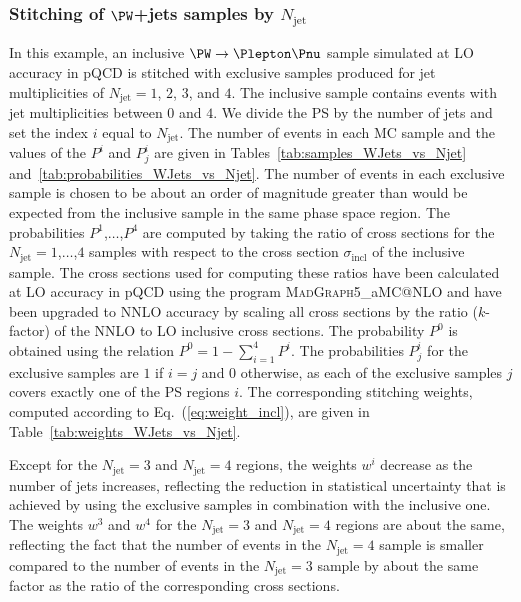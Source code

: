 \documentclass[twocolumn,epjc3]{svjour3}
\makeatletter
\newcommand{\incl}{\ensuremath{\textrm{incl}}\xspace}
\newcommand{\jet}{\ensuremath{\textrm{jet}}\xspace}
\newcommand{\MGvATNLO}{\textsc{MadGraph5}\_aMC@NLO\xspace}
\makeatother
\begin{document}
\subsubsection{Stitching of \texorpdfstring{$\PW$}{W}+jets samples by \texorpdfstring{$N_{\jet}$}{Njet}}
\label{sec:WJets_vs_Njet}

In this example, an inclusive $\PW \to \Plepton\Pnu$ sample simulated at LO accuracy in pQCD 
is stitched with exclusive samples produced for jet multiplicities of $N_{\jet} = 1$, $2$, $3$, and $4$.
The inclusive sample contains events with jet multiplicities between $0$ and $4$.
We divide the PS by the number of jets and set the index $i$ equal to $N_{\jet}$.
The number of events in each MC sample and the values of the $P^{i}$ and $P_{j}^{i}$ are given in 
Tables~\ref{tab:samples_WJets_vs_Njet} and~\ref{tab:probabilities_WJets_vs_Njet}.
The number of events in each exclusive sample is chosen to be about an order of magnitude greater
than would be expected from the inclusive sample in the same phase space region.
The probabilities $P^{1}$,$\ldots$,$P^{4}$ are computed by taking the ratio of cross sections 
for the $N_{\jet} = 1$,$\ldots$,$4$ samples with respect to the cross section $\sigma_{\incl}$ of the inclusive sample.
The cross sections used for computing these ratios have been calculated at LO accuracy in pQCD using the program \MGvATNLO
and have been upgraded to NNLO accuracy by scaling all cross sections by the ratio ($k$-factor) of the NNLO to LO inclusive cross sections.
The probability $P^{0}$ is obtained using the relation $P^{0} = 1 - \sum_{i=1}^{4} P^{i}$.
The probabilities $P_{j}^{i}$ for the exclusive samples are $1$ if $i=j$ and $0$ otherwise,
as each of the exclusive samples $j$ covers exactly one of the PS regions $i$.
The corresponding stitching weights, computed according to Eq.~(\ref{eq:weight_incl}), are given in Table~\ref{tab:weights_WJets_vs_Njet}.

Except for the $N_{\jet} = 3$ and $N_{\jet} = 4$ regions,
the weights $w^{i}$ decrease as the number of jets increases, 
reflecting the reduction in statistical uncertainty that is achieved by using the exclusive samples in combination with the inclusive one.
The weights $w^{3}$ and $w^{4}$ for the $N_{\jet} = 3$ and $N_{\jet} = 4$ regions are about the same,
reflecting the fact that the number of events in the $N_{\jet} = 4$ sample is smaller compared to the number of events in the $N_{\jet} = 3$ sample
by about the same factor as the ratio of the corresponding cross sections.
\end{document}
